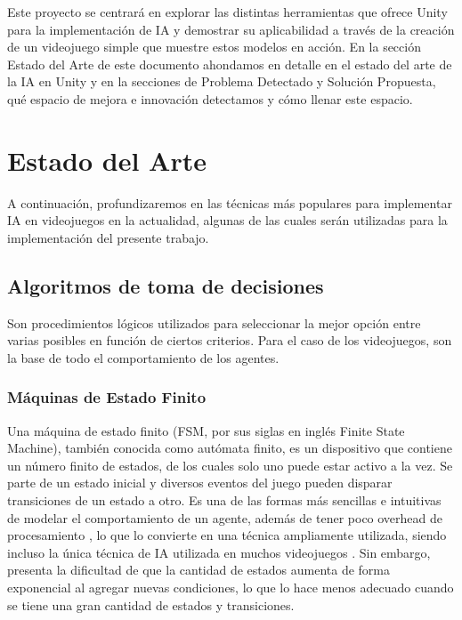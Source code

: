 \documentclass[a4paper]{article}
\begin{document}
Este proyecto se centrará en explorar las distintas herramientas que ofrece Unity para la implementación de IA y demostrar su aplicabilidad a través de la creación de un videojuego simple que muestre estos modelos en acción. En la sección Estado del Arte de este documento ahondamos en detalle en el estado del arte de la IA en Unity y en la secciones de Problema Detectado y Solución Propuesta, qué espacio de mejora e innovación detectamos y cómo llenar este espacio.

\section{Estado del Arte}

A continuación, profundizaremos en las técnicas más populares para implementar IA en videojuegos en la actualidad, algunas de las cuales serán utilizadas para la implementación del presente trabajo.

\subsection{Algoritmos de toma de decisiones}

Son procedimientos lógicos utilizados para seleccionar la mejor opción entre varias posibles en función de ciertos criterios. Para el caso de los videojuegos, son la base de todo el comportamiento de los agentes.

\subsubsection{Máquinas de Estado Finito}

Una máquina de estado finito (FSM, por sus siglas en inglés Finite State Machine), también conocida como autómata finito, es un dispositivo que contiene un número finito de estados, de los cuales solo uno puede estar activo a la vez. Se parte de un estado inicial y diversos eventos del juego pueden disparar transiciones de un estado a otro. Es una de las formas más sencillas e intuitivas de modelar el comportamiento de un agente, además de tener poco overhead de procesamiento \cite{programming_game_ai_by_example}, lo que lo convierte en una técnica ampliamente utilizada, siendo incluso la única técnica de IA utilizada en muchos videojuegos \cite{unity_artificial_intelligence_programming}. Sin embargo, presenta la dificultad de que la cantidad de estados aumenta de forma exponencial al agregar nuevas condiciones, lo que lo hace menos adecuado cuando se tiene una gran cantidad de estados y transiciones.
\end{document}
